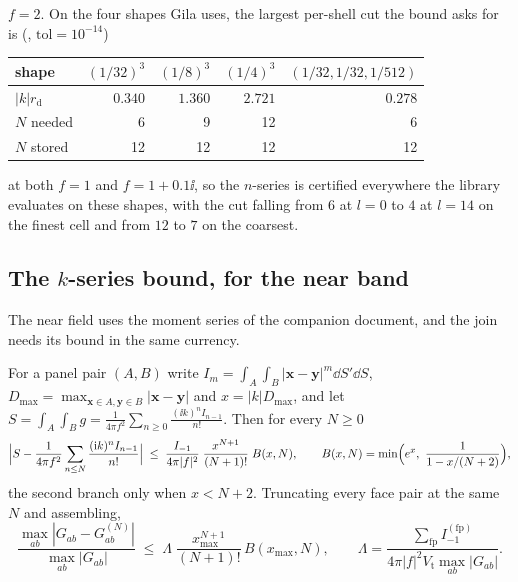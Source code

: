 \begin{remark}
$f = 2$. On the four shapes Gila uses, the largest per-shell cut the bound asks for is
(, $\mathrm{tol} = 10^{-14}$)
\begin{center}\small
\begin{tabular}{@{}lrrrr@{}}
\toprule
shape & $(1/32)^3$ & $(1/8)^3$ & $(1/4)^3$ & $(1/32,1/32,1/512)$\\
\midrule
$|k|r_{\mathrm{d}}$ & $0.340$ & $1.360$ & $2.721$ & $0.278$\\
$N$ needed & 6 & 9 & 12 & 6\\
$N$ stored & 12 & 12 & 12 & 12\\
\bottomrule
\end{tabular}
\end{center}
\noindent
at both $f = 1$ and $f = 1+0.1\ii$, so the $n$-series is certified everywhere the library
evaluates on these shapes, with the cut falling from $6$ at $l = 0$ to $4$ at $l = 14$ on
the finest cell and from $12$ to $7$ on the coarsest.
\end{remark}

\subsection{\texorpdfstring{The $k$-series bound, for the near band}{The k-series bound, for the near band}}
\label{sec:bnd:kser}

The near field uses the moment series of the companion document, and the join needs its
bound in the same currency.

\begin{theorem}
\label{thm:bnd:kser}
For a panel pair $(A,B)$ write $I_m = \int_A\int_B|\mathbf{x}-\mathbf{y}|^{m}\dd S'\dd S$,
$D_{\max} = \max_{\mathbf{x}\in A,\mathbf{y}\in B}|\mathbf{x}-\mathbf{y}|$ and
$x = |k|D_{\max}$, and let
$S = \int_A\int_B g = \frac{1}{4\pi f^{2}}\sum_{n\ge0}\frac{(\ii k)^{n}I_{n-1}}{n!}$.
Then for every $N \ge 0$
\begin{equation}
\Bigl|S - \frac{1}{4\pi f^{2}}\sum_{n\le N}\frac{(\mathrm{i} k)^{n}I_{n-1}}{n!}\Bigr|
\;\le\;
\frac{I_{-1}}{4\pi|f|^{2}}\;\frac{x^{N+1}}{(N+1)!}\;B(x,N),
\qquad
B(x,N) = \min\Bigl(e^{x},\ \frac{1}{1-x/(N+2)}\Bigr),
\label{eq:bnd:kser}
\end{equation}
the second branch only when $x < N+2$. Truncating every face pair at the same $N$ and
assembling,
\begin{equation}
\frac{\max_{ab}|G_{ab}-G^{(N)}_{ab}|}{\max_{ab}|G_{ab}|}
\;\le\; \Lambda\;\frac{x_{\max}^{N+1}}{(N+1)!}\,B(x_{\max},N),
\qquad
\Lambda = \frac{\sum_{\mathrm{fp}}I_{-1}^{(\mathrm{fp})}}
{4\pi|f|^{2}V_{\mathrm{t}}\max_{ab}|G_{ab}|} .
\label{eq:bnd:kasm}
\end{equation}
\end{theorem}

